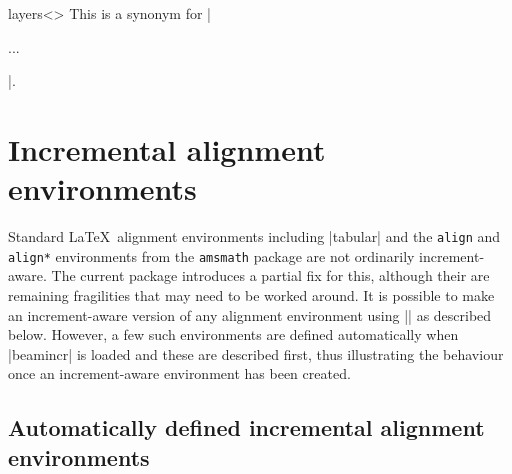 \documentclass[a4paper]{ltxdoc}
\begin{document}
\begin{environment}{{layers<>}
    }
  This is a synonym for |\begin{incrementallayers} ... \end{incrementallayers}|.
\end{environment}





\section{Incremental alignment environments}\label{sec:align}

Standard \LaTeX\ alignment environments including |tabular| and the \texttt{align}
and \texttt{align*} environments from the \texttt{amsmath} package are not
ordinarily increment-aware.  The current package introduces a partial fix for
this, although their are remaining fragilities that may need to be worked
around.  It is possible to make an increment-aware version of any alignment
environment using |\CreateIncrementalAlignmentEnvironment| as described below.
However, a few such environments are defined automatically when |beamincr| is
loaded and these are described first, thus illustrating the behaviour once an
increment-aware environment has been created.

\subsection{Automatically defined incremental alignment environments}\label{sec:align:auto}
\end{document}
